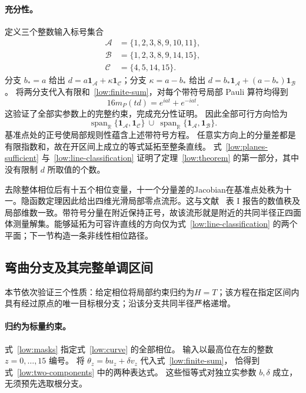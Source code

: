 \paragraph{充分性。}
定义三个整数输入标号集合
\begin{align}
 \mathcal A&=\{1,2,3,8,9,10,11\},\nonumber\\
 \mathcal B&=\{1,2,3,8,9,14,15\},\nonumber\\
 \mathcal C&=\{4,5,14,15\}.
 \label{low:line-supports}
\end{align}
分支 $b_*=a$ 给出 $d=a\mathbf1_{\mathcal A}
+\kappa\mathbf1_{\mathcal C}$；分支 $\kappa=a-b_*$ 给出
$d=b_*\mathbf1_{\mathcal A}+(a-b_*)\mathbf1_{\mathcal B}$。
将两分支代入有限和~\eqref{low:finite-sum}，对每个带符号局部 Pauli 算符均得到
\begin{equation}
 16m_P(td)=e^{iat}+e^{-iat}.
 \label{low:planes-sufficient}
\end{equation}
这验证了全部实参数上的完整约束，完成充分性证明。
因此全部可行方向恰为
\begin{equation}
 \operatorname{span}_{\mathbb R}
 \{\mathbf1_{\mathcal A},\mathbf1_{\mathcal C}\}
 \ \cup\ 
 \operatorname{span}_{\mathbb R}
 \{\mathbf1_{\mathcal A},\mathbf1_{\mathcal B}\}.
 \label{low:line-classification}
\end{equation}
基准点处的正号使局部规则性蕴含上述带符号方程。
任意实方向上的分量差都是有限指数和，故在开区间上成立的等式延拓至整条直线。
式~\eqref{low:planes-sufficient} 与~\eqref{low:line-classification}
证明了定理~\ref{low:theorem} 的第一部分，其中没有限制 $d$ 所取值的个数。

去除整体相位后有十五个相位变量，十一个分量差的Jacobian在基准点处秩为十一。隐函数定理因此给出四维光滑局部零点流形。这与文献~\cite{PauwelsGisin2026} 表 I 报告的数值秩及局部维数一致。带符号分量在附近保持正号，故该流形就是附近的共同半径正四面体测量解集。能够延拓为可容许直线的方向仅为式~\eqref{low:line-classification} 的两个平面；下一节构造一条非线性相位路径。

\subsection{弯曲分支及其完整单调区间}
\label{low:app-curve}

本节依次验证三个性质：给定相位将局部约束归约为$H=T$；该方程在指定区间内具有经过原点的唯一目标根分支；沿该分支共同半径严格递增。

\paragraph{归约为标量约束。}
式~\eqref{low:masks} 指定式~\eqref{low:curve} 的全部相位。
输入以最高位在左的整数 $z=0,\ldots,15$ 编号。
将 $\theta_z=bu_z+\delta v_z$ 代入式~\eqref{low:finite-sum}，
恰得到式~\eqref{low:two-components} 中的两种表达式。
这些恒等式对独立实参数 $b,\delta$ 成立，无须预先选取根分支。

